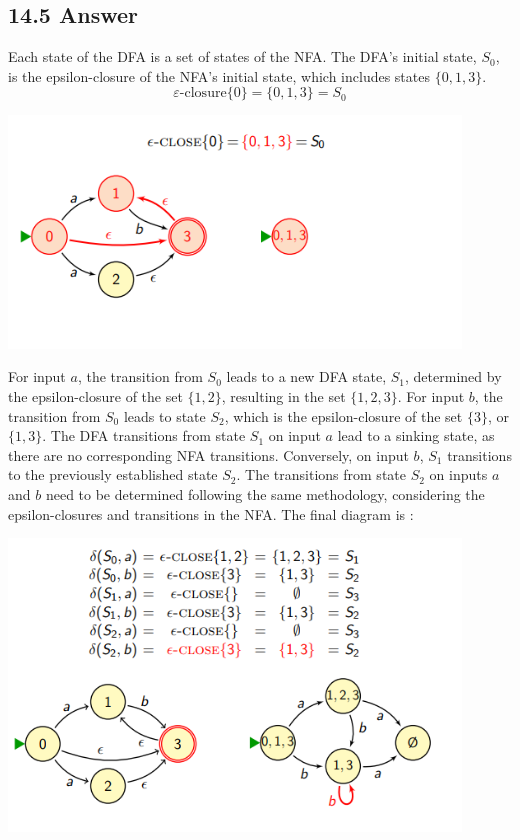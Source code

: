 \documentclass{article}
\begin{document}
\subsection*{14.5 Answer}
Each state of the DFA is a set of states of the NFA. The DFA's initial state, $S_0$, is the epsilon-closure of the NFA's initial state, which includes states $\{0, 1, 3\}$.
\[\varepsilon\text{-closure}\{0\} = \{0, 1, 3\} = S_0\]
\begin{center}
    \includegraphics[width=12cm]{4.png}
\end{center}
For input $a$, the transition from $S_0$ leads to a new DFA state, $S_1$, determined by the epsilon-closure of the set $\{1, 2\}$, resulting in the set $\{1, 2, 3\}$. For input $b$, the transition from $S_0$ leads to state $S_2$, which is the epsilon-closure of the set $\{3\}$, or $\{1, 3\}$. The DFA transitions from state $S_1$ on input $a$ lead to a sinking state, as there are no corresponding NFA transitions. Conversely, on input $b$, $S_1$ transitions to the previously established state $S_2$. The transitions from state $S_2$ on inputs $a$ and $b$ need to be determined following the same methodology, considering the epsilon-closures and transitions in the NFA.
The final diagram is : 
\begin{center}
    \includegraphics[width=12cm]{5.png}
\end{center}
\newpage
\end{document}
